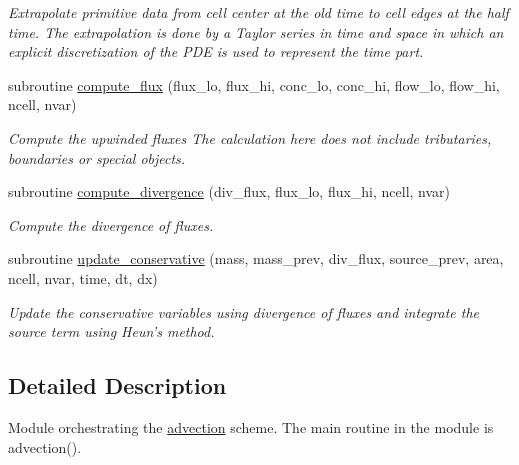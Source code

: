 \begin{CompactItemize}
\begin{CompactList}\small\item\em Extrapolate primitive data from cell center at the old time to cell edges at the half time. The extrapolation is done by a Taylor series in time and space in which an explicit discretization of the PDE is used to represent the time part. \item\end{CompactList}\item 
subroutine \hyperlink{a00052_3947a8a29b1c666b2d1b7223215e9873}{compute\_\-flux} (flux\_\-lo, flux\_\-hi, conc\_\-lo, conc\_\-hi, flow\_\-lo, flow\_\-hi, ncell, nvar)
\begin{CompactList}\small\item\em Compute the upwinded fluxes The calculation here does not include tributaries, boundaries or special objects. \item\end{CompactList}\item 
subroutine \hyperlink{a00052_aa34a3af6ce02dba4b6a11c1b38f51f0}{compute\_\-divergence} (div\_\-flux, flux\_\-lo, flux\_\-hi, ncell, nvar)
\begin{CompactList}\small\item\em Compute the divergence of fluxes. \item\end{CompactList}\item 
subroutine \hyperlink{a00052_8d00316cd8f52a398f27fa60b0ded0de}{update\_\-conservative} (mass, mass\_\-prev, div\_\-flux, source\_\-prev, area, ncell, nvar, time, dt, dx)
\begin{CompactList}\small\item\em Update the conservative variables using divergence of fluxes and integrate the source term using Heun's method. \item\end{CompactList}\end{CompactItemize}


\subsection{Detailed Description}
Module orchestrating the \hyperlink{a00052}{advection} scheme. The main routine in the module is advection(). 



